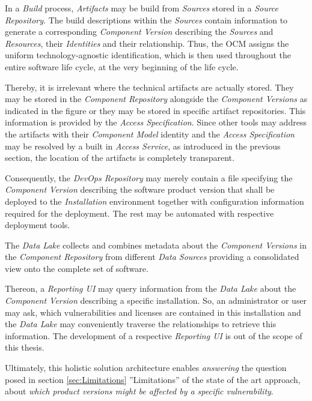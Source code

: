 In a \emph{Build} process, \emph{Artifacts} may be build from \emph{Sources} stored in a \emph{Source Repository}. The build descriptions within the \emph{Sources} contain information to generate a corresponding \emph{Component Version} describing the \emph{Sources} and \emph{Resources}, their \emph{Identities} and their relationship. Thus, the OCM assigns the uniform technology-agnostic identification, which is then used throughout the entire software life cycle, at the very beginning of the life cycle.\par
Thereby, it is irrelevant where the technical artifacts are actually stored. They may be stored in the \emph{Component Repository} alongside the \emph{Component Versions} as indicated in the figure or they may be stored in specific artifact repositories. This information is provided by the \emph{Access Specification}. Since other tools may address the artifacts with their \emph{Component Model} identity and the \emph{Access Specification} may be resolved by a built in \emph{Access Service}, as introduced in the previous section, the location of the artifacts is completely transparent.\par
Consequently, the \emph{DevOps Repository} may merely contain a file specifying the \emph{Component Version} describing the software product version that shall be deployed to the \emph{Installation} environment together with configuration information required for the deployment. The rest may be automated with respective deployment tools.\par
The \emph{Data Lake} collects and combines metadata about the \emph{Component Versions} in the \emph{Component Repository} from different \emph{Data Sources} providing a consolidated view onto the complete set of software.\par
Thereon, a \emph{Reporting UI} may query information from the \emph{Data Lake} about the \emph{Component Version} describing a specific installation. So, an administrator or user may ask, which vulnerabilities and licenses are contained in this installation and the \emph{Data Lake} may conveniently traverse the relationships to retrieve this information. The development of a respective \emph{Reporting UI} is out of the scope of this thesis.\par
Ultimately, this holistic solution architecture enables \emph{answering} the question posed in section \ref{sec:Limitations} ''Limitations'' of the state of the art approach, about \emph{which product versions might be affected by a specific vulnerability}.